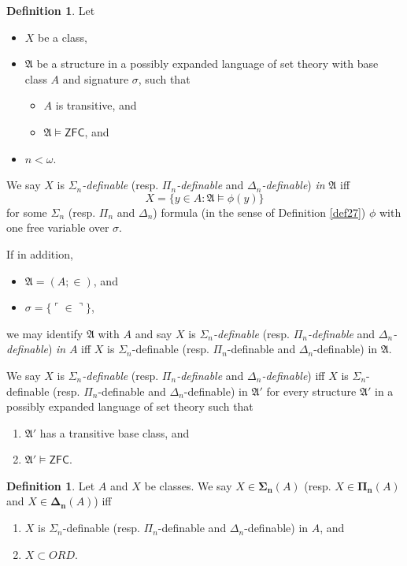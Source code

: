 \documentclass[12pt, twoside]{memoir}
\numberwithin{equation}{section}
\theoremstyle{definition}
\newtheorem{defi}[thm]{Definition}
\theoremstyle{remark}
\theoremstyle{definition}
\theoremstyle{definition}
\theoremstyle{definition}
\theoremstyle{remark}
\begin{document}
\begin{defi}
Let 
\begin{itemize}
    \item $X$ be a class, 
    \item $\mathfrak{A}$ be a structure in a possibly expanded language of set theory with base class $A$ and signature $\sigma$, such that 
    \begin{itemize}[label=$\circ$]
        \item $A$ is transitive, and
        \item $\mathfrak{A} \models \mathsf{ZFC}$, and
    \end{itemize}
    \item $n < \omega$.
\end{itemize}
We say $X$ is $\Sigma_n$\emph{-definable} (resp. $\Pi_n$\emph{-definable} and $\Delta_n$\emph{-definable}) \emph{in} $\mathfrak{A}$ iff $$X = \{y \in A : \mathfrak{A} \models \phi(y)\}$$ for some $\Sigma_n$ (resp. $\Pi_n$ and $\Delta_n$) formula (in the sense of Definition \ref{def27}) $\phi$ with one free variable over $\sigma$.

If in addition,
\begin{itemize}
    \item $\mathfrak{A} = (A; \in)$, and
    \item $\sigma = \{\ulcorner \in \urcorner\}$,
\end{itemize}
we may identify $\mathfrak{A}$ with $A$ and say $X$ is $\Sigma_n$\emph{-definable} (resp. $\Pi_n$\emph{-definable} and $\Delta_n$\emph{-definable}) \emph{in} $A$ iff $X$ is $\Sigma_n$-definable (resp. $\Pi_n$-definable and $\Delta_n$-definable) in $\mathfrak{A}$. 

We say $X$ is $\Sigma_n$\emph{-definable} (resp. $\Pi_n$\emph{-definable} and $\Delta_n$\emph{-definable}) iff $X$ is $\Sigma_n$-definable (resp. $\Pi_n$-definable and $\Delta_n$-definable) in $\mathfrak{A}'$ for every structure $\mathfrak{A}'$ in a possibly expanded language of set theory such that
\begin{enumerate}[label=(\alph*)]
    \item $\mathfrak{A}'$ has a transitive base class, and
    \item $\mathfrak{A}' \models \mathsf{ZFC}$.
\end{enumerate}
\end{defi}

\begin{defi}
Let $A$ and $X$ be classes. We say $X \in \mathbf{\Sigma_n}(A)$ (resp. $X \in \mathbf{\Pi_n}(A)$ and $X \in \mathbf{\Delta_n}(A)$) iff
\begin{enumerate}[label=(\alph*)]
    \item $X$ is $\Sigma_n$-definable (resp. $\Pi_n$-definable and $\Delta_n$-definable) in $A$, and
    \item $X \subset ORD$.
\end{enumerate}
\end{defi}
\end{document}
